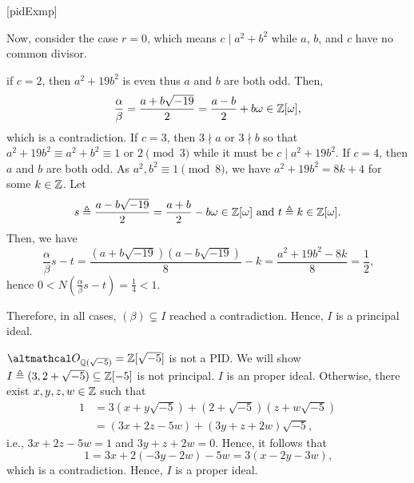 \documentclass[../modern_algebra_2.tex]{subfiles}
\begin{document}
\begin{Example}{}[pidExmp]
\begin{enumerate}[label=(\roman*), ref=\protect{\Cref{exmp:pidExmp} (\roman*)}]
\begin{itemize}
\begin{itemize}
            \ii
            Now, consider the case \(r = 0\), which means \(c \mid a^2 + b^2\) while
            \(a\), \(b\), and \(c\) have no common divisor.
            \begin{itemize}
                \ii
                if \(c = 2\), then \(a^2 + 19b^2\) is even thus \(a\) and \(b\) are both odd.
                Then,
                \[
                    \frac{\alpha}{\beta} = \frac{a+b\sqrt{-19}}{2} = \frac{a-b}{2} + b\omega \in
                    \ZZ{}[\omega]\text{,}
                \]
                which is a contradiction.
                \ii
                If \(c = 3\), then \(3 \nmid a\) or \(3 \nmid b\) so that
                \(a^2 + 19b^2 \equiv a^2 + b^2 \equiv 1 \text{ or } 2 \pmod{3}\)
                while it must be \(c \mid a^2 + 19b^2\).
                \ii
                If \(c = 4\), then \(a\) and \(b\) are both odd.
                As \(a^2, b^2 \equiv 1 \pmod{8}\), we have \(a^2 + 19b^2 = 8k + 4\) for some \(k \in
                \ZZ\). Let
                \[
                    s \triangleq \frac{a-b\sqrt{-19}}{2} = \frac{a+b}{2} - b\omega \in \ZZ{}[\omega]
                    \text{ and }
                    t \triangleq k \in \ZZ{}[\omega]\text{.}
                \]
                Then, we have
                \[
                    \frac{\alpha}{\beta}s - t
                    = \frac{(a+b\sqrt{-19})(a-b\sqrt{-19})}{8} - k
                    = \frac{a^2+19b^2-8k}{8} = \frac{1}{2}\text{,}
                \]
                hence \(0 < N \left(\frac{\alpha}{\beta}s - t\right) = \frac{1}{4} < 1\).
            \end{itemize}
        \end{itemize}
    \end{itemize}
    Therefore, in all cases, \((\beta) \subsetneq I\) reached a contradiction.
    Hence, \(I\) is a principal ideal.

    \ii
    \(\rqi{\sqrt{-5}} = \ZZ{}[\sqrt{-5}]\) is not a PID.
    We will show \(I \triangleq (3, 2+\sqrt{-5}) \subseteq \ZZ{}[-5]\) is not principal.
    \(I\) is an proper ideal.
    Otherwise, there exist \(x, y, z, w \in \ZZ\) such that
    \begin{align*}
        1 &= 3(x+y\sqrt{-5}) + (2+\sqrt{-5})(z+w\sqrt{-5}) \\
          &= (3x+2z-5w) + (3y+z+2w)\sqrt{-5}\text{,}
    \end{align*}
    i.e., \(3x+2z-5w=1\) and \(3y+z+2w=0\).
    Hence, it follows that
    \[
        1 = 3x + 2(-3y-2w) - 5w = 3(x-2y-3w)\text{,}
    \]
    which is a contradiction. Hence, \(I\) is a proper ideal.


\end{enumerate}
\end{Example}
\end{document}

